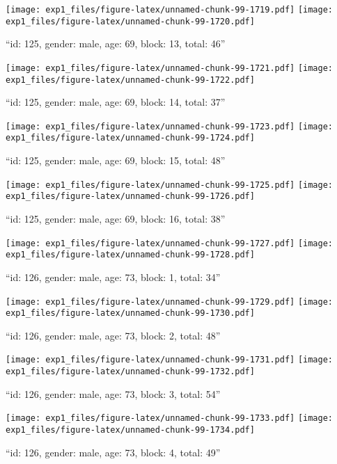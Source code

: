 \documentclass[,]{article}
\begin{document}
\texttt{[image: exp1\_files/figure-latex/unnamed-chunk-99-1719.pdf]}
\texttt{[image: exp1\_files/figure-latex/unnamed-chunk-99-1720.pdf]}

\newpage
[1] 

``id: 125, gender: male, age: 69, block: 13, total: 46''

\texttt{[image: exp1\_files/figure-latex/unnamed-chunk-99-1721.pdf]}
\texttt{[image: exp1\_files/figure-latex/unnamed-chunk-99-1722.pdf]}

\newpage
[1] 

``id: 125, gender: male, age: 69, block: 14, total: 37''

\texttt{[image: exp1\_files/figure-latex/unnamed-chunk-99-1723.pdf]}
\texttt{[image: exp1\_files/figure-latex/unnamed-chunk-99-1724.pdf]}

\newpage
[1] 

``id: 125, gender: male, age: 69, block: 15, total: 48''

\texttt{[image: exp1\_files/figure-latex/unnamed-chunk-99-1725.pdf]}
\texttt{[image: exp1\_files/figure-latex/unnamed-chunk-99-1726.pdf]}

\newpage
[1] 

``id: 125, gender: male, age: 69, block: 16, total: 38''

\texttt{[image: exp1\_files/figure-latex/unnamed-chunk-99-1727.pdf]}
\texttt{[image: exp1\_files/figure-latex/unnamed-chunk-99-1728.pdf]}

\newpage
[1] 

``id: 126, gender: male, age: 73, block: 1, total: 34''

\texttt{[image: exp1\_files/figure-latex/unnamed-chunk-99-1729.pdf]}
\texttt{[image: exp1\_files/figure-latex/unnamed-chunk-99-1730.pdf]}

\newpage
[1] 

``id: 126, gender: male, age: 73, block: 2, total: 48''

\texttt{[image: exp1\_files/figure-latex/unnamed-chunk-99-1731.pdf]}
\texttt{[image: exp1\_files/figure-latex/unnamed-chunk-99-1732.pdf]}

\newpage
[1] 

``id: 126, gender: male, age: 73, block: 3, total: 54''

\texttt{[image: exp1\_files/figure-latex/unnamed-chunk-99-1733.pdf]}
\texttt{[image: exp1\_files/figure-latex/unnamed-chunk-99-1734.pdf]}

\newpage
[1] 

``id: 126, gender: male, age: 73, block: 4, total: 49''
\end{document}
